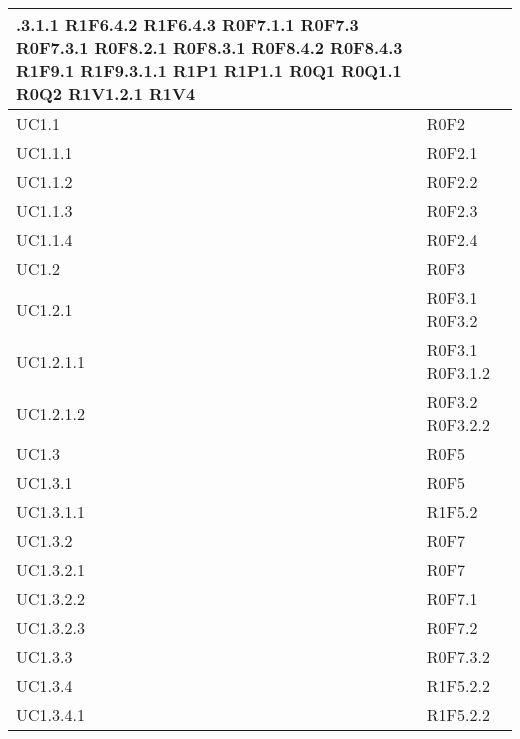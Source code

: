 \begin{center}
\begin{longtable}{| p{4cm} | p{4cm} |}
.3.1.1 \newline R1F6.4.2 \newline R1F6.4.3 \newline R0F7.1.1 \newline R0F7.3 \newline R0F7.3.1 \newline R0F8.2.1 \newline R0F8.3.1 \newline R0F8.4.2 \newline R0F8.4.3 \newline R1F9.1 \newline R1F9.3.1.1 \newline R1P1 \newline R1P1.1 \newline R0Q1 \newline R0Q1.1 \newline R0Q2 \newline R1V1.2.1 \newline R1V4 \\
		\hline
		UC1.1  &  R0F2 \\
		\hline
		UC1.1.1  &  R0F2.1 \\
		\hline
		UC1.1.2  &  R0F2.2 \\
		\hline
		UC1.1.3  &  R0F2.3 \\
		\hline
		UC1.1.4  &  R0F2.4 \\
		\hline
		UC1.2  &  R0F3 \\
		\hline
		UC1.2.1  &  R0F3.1 \newline R0F3.2 \\
		\hline
		UC1.2.1.1  &  R0F3.1 \newline R0F3.1.2 \\
		\hline
		UC1.2.1.2  &  R0F3.2 \newline R0F3.2.2 \\
		\hline
		UC1.3  &  R0F5 \\
		\hline
		UC1.3.1  &  R0F5 \\
		\hline
		UC1.3.1.1  &  R1F5.2 \\
		\hline
		UC1.3.2  &  R0F7 \\
		\hline
		UC1.3.2.1  &  R0F7 \\
		\hline
		UC1.3.2.2  &  R0F7.1 \\
		\hline
		UC1.3.2.3  &  R0F7.2 \\
		\hline
		UC1.3.3  &  R0F7.3.2 \\
		\hline
		UC1.3.4  &  R1F5.2.2 \\
		\hline
		UC1.3.4.1  &  R1F5.2.2 \\

\end{longtable}
\end{center}
